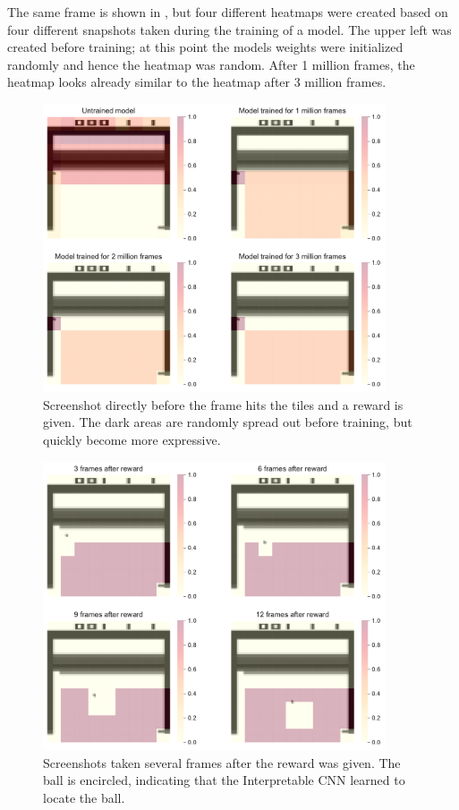 The same frame is shown in , but four different heatmaps were created based on four different snapshots taken during the training of a model. The upper left was created before training; at this point the models weights were initialized randomly and hence the heatmap was random. After 1 million frames, the heatmap looks already similar to the heatmap after 3 million frames.

\begin{figure}[ht!]
    \centering
    \includegraphics[width=0.9\textwidth]{plots/heatmaps/breakout_heatmap_training_comparison_before_reward.pdf}
    \caption{Screenshot directly before the frame hits the tiles and a reward is given. The dark areas are randomly spread out before training, but quickly become more expressive.}
    \label{fig:heatmap_before_reward_comparison}
\end{figure}

\begin{figure}[ht!]
    \centering
    \includegraphics[width=0.9\textwidth]{plots/heatmaps/breakout_heatmap_temporal_comparison_after_reward.pdf}
    \caption{Screenshots taken several frames after the reward was given. The ball is encircled, indicating that the Interpretable CNN learned to locate the ball.}
    \label{fig:heatmap_after_reward_comparison}
\end{figure}

